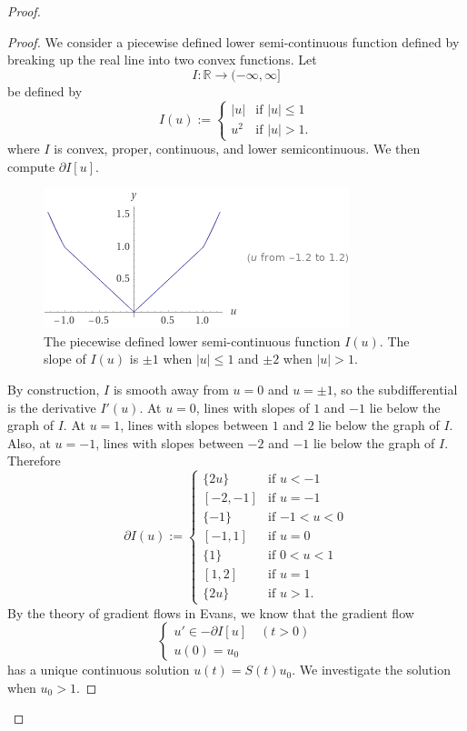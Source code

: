 \documentclass{article}
\begin{document}
\begin{flushleft}
\begin{proof}
\begin{proof}
We consider a piecewise defined lower semi-continuous function defined by breaking up the real line into two convex functions. Let $$I:\mathbb R \to (-\infty,\infty]$$
be defined by
$$I(u):=
  \begin{cases} 
      |u| & \text{if $|u|\leq 1$} \\
      u^2 & \text{if $|u|> 1$}.
   \end{cases}
$$
where $I$ is convex, proper, continuous, and lower semicontinuous. We then compute $\partial I[u]$. 
\begin{figure}[!ht]
\begin{center}
\includegraphics[scale=1.1]{function_u.png}
\caption{The piecewise defined lower semi-continuous function $I(u)$. The slope of $I(u)$ is $\pm 1$ when $|u|\leq 1$ and $\pm 2$ when $|u|> 1$. }
\end{center}
\end{figure}
By construction, $I$ is smooth away from $u=0$ and $u=\pm 1$, so the subdifferential is the derivative $I'(u)$. At $u=0$, lines with slopes of $1$ and $-1$ lie below the graph of $I$. At $u=1$, lines with slopes between $1$ and $2$ lie below the graph of $I$. Also, at $u=-1$, lines with slopes between $-2$ and $-1$ lie below the graph of $I$. Therefore
$$\partial I(u):=
  \begin{cases} 
      \{2u\} & \text{if $u< -1$} \\
      [-2,-1] & \text{if $u=-1$} \\
      \{-1\} & \text{if $-1<u<0$} \\
      [-1,1] & \text{if $u=0$} \\
      \{1\} & \text{if $0 < u < 1$} \\
      [1,2] & \text{if $u=1$} \\
      \{2u\} & \text{if $u > 1$}.
   \end{cases}
$$
By the theory of gradient flows in Evans, we know that the gradient flow
$$
  \begin{cases} 
      u'\in -\partial I[u]\quad (t>0)\\
      u(0)=u_0
   \end{cases}
$$
has a unique continuous solution $u(t)=S(t)u_0$. We investigate the solution when $u_0>1$.


\end{proof}
\end{proof}
\end{flushleft}
\end{document}
